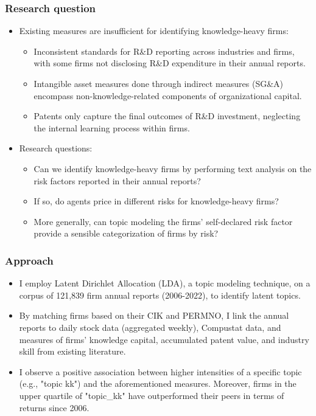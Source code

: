 \documentclass{beamer}
\begin{document}
\begin{frame}
\frametitle{Research question}
  \begin{itemize}
  \item Existing measures are insufficient for identifying knowledge-heavy firms:
\begin{itemize}
\item Inconsistent standards for R\&D reporting across industries and firms, with some firms not disclosing R\&D expenditure in their annual reports.
\item Intangible asset measures done through indirect measures (SG\&A) encompass non-knowledge-related components of organizational capital.
\item Patents only capture the final outcomes of R\&D investment, neglecting the internal learning process within firms.
\end{itemize}
\item Research questions:
\begin{itemize}
\item Can we identify knowledge-heavy firms by performing text analysis on the risk factors reported in their annual reports?
\item If so, do agents price in different risks for knowledge-heavy firms?
\item More generally, can topic modeling the firms' self-declared risk factor provide a sensible categorization of firms by risk?
\end{itemize}
\end{itemize}
\end{frame}


\begin{frame}
\frametitle{Approach}
\begin{itemize}
\item I employ Latent Dirichlet Allocation (LDA), a topic modeling technique, on a corpus of 121,839 firm annual reports (2006-2022), to identify latent topics.
\item By matching firms based on their CIK and PERMNO, I link the annual reports to daily stock data (aggregated weekly), Compustat data, and measures of firms' knowledge capital, accumulated patent value, and industry skill from existing literature.
\item I observe a positive association between higher intensities of a specific topic (e.g., "topic kk") and the aforementioned measures. Moreover, firms in the upper quartile of "topic\_kk" have outperformed their peers in terms of returns since 2006.
\end{itemize}

\end{frame}
\end{document}
